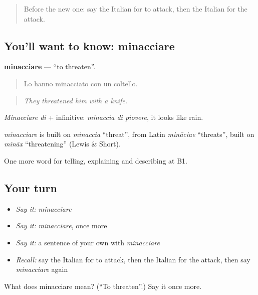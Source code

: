 \label{lesson:IT-C298-minacciare}



\begin{quote}
Before the new one: say the Italian for to attack, then the Italian for the attack.
\end{quote}

\subsection*{You'll want to know: minacciare}
\textbf{minacciare} — \textquotedblleft{}to threaten\textquotedblright{}.

\begin{quote}
Lo hanno minacciato con un coltello.
\end{quote}

\begin{quote}
\emph{They threatened him with a knife.}
\end{quote}

\emph{Minacciare di} + infinitive: \emph{minaccia di piovere}, it looks like rain.

\begin{cousinweb}
\emph{minacciare} is built on \emph{minaccia} \textquotedblleft{}threat\textquotedblright{}, from Latin \emph{mināciae} \textquotedblleft{}threats\textquotedblright{}, built on \emph{mināx} \textquotedblleft{}threatening\textquotedblright{} (Lewis \& Short).
\end{cousinweb}

\begin{grammarlens}[title={What you've built}]
One more word for telling, explaining and describing at B1.
\end{grammarlens}

\subsection*{Your turn}
\begin{itemize}
\raggedright
  \item \emph{Say it:} \emph{minacciare}
  \item \emph{Say it:} \emph{minacciare}, once more
  \item \emph{Say it:} a sentence of your own with \emph{minacciare}
  \item \emph{Recall:} say the Italian for to attack, then the Italian for the attack, then say \emph{minacciare} again
\end{itemize}

\begin{tcolorbox}[breakable,colback=teal!4,colframe=teal!35!black,title={Before you move on}]
What does minacciare mean? (\textquotedblleft{}To threaten\textquotedblright{}.) Say it once more.
\end{tcolorbox}
